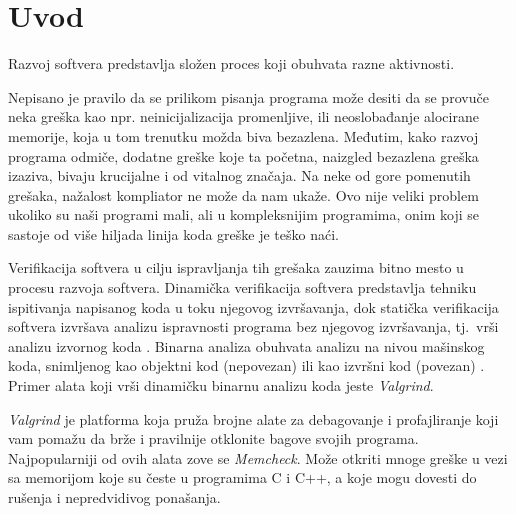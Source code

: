 \documentclass[12pt,oneside]{memoir}
\theoremstyle{plain}
\theoremstyle{definition}
\begin{document}
\frontmatter
\naslovna
\komisija
\apstrakt
\tableofcontents*

\mainmatter

\chapter{Uvod}
Razvoj softvera predstavlja složen proces koji obuhvata razne aktivnosti. 

Nepisano je pravilo da se prilikom pisanja programa može desiti da se provuče neka greška kao npr. neinicijalizacija promenljive, ili neoslobađanje alocirane memorije, koja u tom trenutku možda biva bezazlena. Međutim, kako razvoj programa odmiče, dodatne greške koje ta početna, naizgled bezazlena greška izaziva, bivaju krucijalne i od vitalnog značaja. Na neke od gore pomenutih grešaka, nažalost kompliator ne može da nam ukaže. Ovo nije veliki problem ukoliko su naši programi mali, ali u  kompleksnijim programima, onim koji se sastoje od više hiljada linija koda greške je teško naći. 

Verifikacija softvera  u cilju ispravljanja tih grešaka zauzima bitno mesto u procesu razvoja softvera. Dinamička verifikacija softvera predstavlja tehniku ispitivanja napisanog koda u toku njegovog izvršavanja, dok statička verifikacija softvera izvršava analizu ispravnosti programa bez njegovog izvršavanja, tj.~vrši analizu izvornog koda \cite{02Motivacija}. Binarna analiza obuhvata analizu na nivou mašinskog koda, snimljenog kao objektni kod (nepovezan) ili kao izvršni kod (povezan) \cite{03DinamickaAnaliza}. Primer alata koji vrši dinamičku binarnu analizu koda jeste \textit{Valgrind}.  

\textit{Valgrind} je platforma koja pruža brojne alate za debagovanje i profajliranje koji vam pomažu da brže i pravilnije otklonite bagove svojih programa. Najpopularniji od ovih alata zove se \textit{Memcheck}. Može otkriti mnoge greške u vezi sa memorijom koje su česte u programima C i C++, a koje mogu dovesti do rušenja i nepredvidivog ponašanja. 
\end{document}
